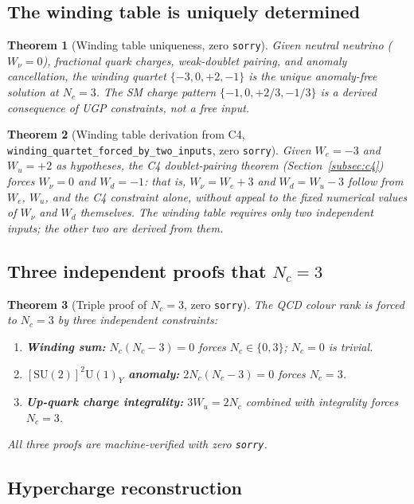 \documentclass[12pt]{article}
\newtheorem{theorem}{Theorem}[section]
\theoremstyle{remark}
\newcommand{\sorry}{\texttt{sorry}}
\newcommand{\lean}[1]{\texttt{#1}}
\begin{document}
\subsection{The winding table is uniquely determined}

\begin{theorem}[Winding table uniqueness, zero \sorry]
\label{thm:unique}
Given neutral neutrino ($W_\nu = 0$), fractional quark charges, weak-doublet
pairing, and anomaly cancellation, the winding quartet $\{-3, 0, +2, -1\}$ is
the \emph{unique} anomaly-free solution at $N_c = 3$.  The SM charge pattern
$\{-1, 0, +2/3, -1/3\}$ is a derived consequence of UGP constraints, not a
free input.
\end{theorem}

\begin{theorem}[Winding table derivation from C4, \lean{winding\_quartet\_forced\_by\_two\_inputs},
zero \sorry]
\label{thm:reduce}
Given $W_e = -3$ and $W_u = +2$ as hypotheses, the C4 doublet-pairing theorem
(Section~\ref{subsec:c4}) forces $W_\nu = 0$ and $W_d = -1$: that is,
$W_\nu = W_e + 3$ and $W_d = W_u - 3$ follow from $W_e$, $W_u$, and the C4
constraint alone, without appeal to the fixed numerical values of $W_\nu$ and
$W_d$ themselves.  The winding table requires only two independent inputs;
the other two are derived from them.
\end{theorem}

\subsection{Three independent proofs that $N_c = 3$}

\begin{theorem}[Triple proof of $N_c = 3$, zero \sorry]
The QCD colour rank is forced to $N_c = 3$ by three independent constraints:
\begin{enumerate}
  \item \textbf{Winding sum:} $N_c(N_c - 3) = 0$ forces $N_c \in \{0, 3\}$;
    $N_c = 0$ is trivial.
  \item \textbf{$[\mathrm{SU}(2)]^2 \mathrm{U}(1)_Y$ anomaly:}
    $2N_c(N_c - 3) = 0$ forces $N_c = 3$.
  \item \textbf{Up-quark charge integrality:}
    $3 W_u = 2 N_c$ combined with integrality forces $N_c = 3$.
\end{enumerate}
All three proofs are machine-verified with zero \sorry.
\end{theorem}

\subsection{Hypercharge reconstruction}
\end{document}
